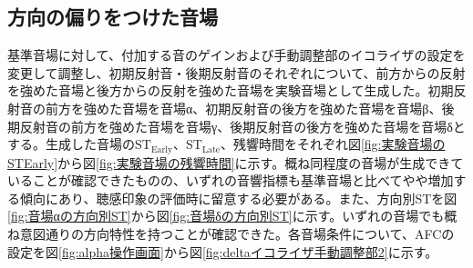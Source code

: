 \documentclass[11pt,a4j]{jreport}
\begin{document}
\subsection{方向の偏りをつけた音場}
基準音場に対して、付加する音のゲインおよび手動調整部のイコライザの設定を変更して調整し、初期反射音・後期反射音のそれぞれについて、前方からの反射を強めた音場と後方からの反射を強めた音場を実験音場として生成した。初期反射音の前方を強めた音場を音場α、初期反射音の後方を強めた音場を音場β、後期反射音の前方を強めた音場を音場γ、後期反射音の後方を強めた音場を音場δとする。生成した音場の$\mathrm{ST_{Early}}$、$\mathrm{ST_{Late}}$、残響時間をそれぞれ図\ref{fig:実験音場のSTEarly}から図\ref{fig:実験音場の残響時間}に示す。概ね同程度の音場が生成できていることが確認できたものの、いずれの音響指標も基準音場と比べてやや増加する傾向にあり、聴感印象の評価時に留意する必要がある。また、方向別STを図\ref{fig:音場αの方向別ST}から図\ref{fig:音場δの方向別ST}に示す。いずれの音場でも概ね意図通りの方向特性を持つことが確認できた。各音場条件について、AFCの設定を図\ref{fig:alpha操作画面}から図\ref{fig:deltaイコライザ手動調整部2}に示す。
\end{document}
